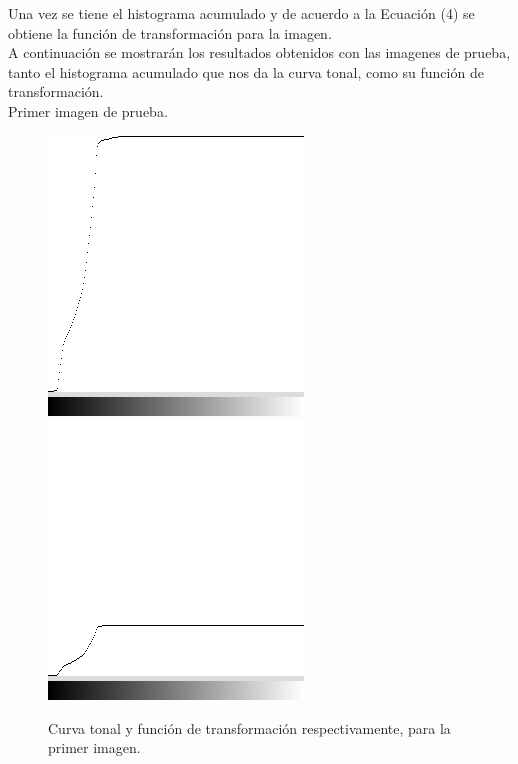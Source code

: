 \documentclass[conference]{IEEEtran}
\begin{document}
Una vez se tiene el histograma acumulado y de acuerdo a la Ecuaci\'on (4) se obtiene la funci\'on de transformaci\'on para la imagen.\\
A continuaci\'on se mostrar\'an los resultados obtenidos con las imagenes de prueba, tanto el histograma acumulado que nos da la curva tonal, como su funci\'on de transformaci\'on.\\

Primer imagen de prueba.
\begin{figure}[h]
	\begin{center}
		\setlength{\unitlength}{0.00105in}
		\includegraphics[scale=0.50]{./images/Ha1.png}
		\includegraphics[scale=0.50]{./images/Ha1_1.png}
	\end{center}
	\caption{Curva tonal y funci\'on de transformaci\'on respectivamente, para la primer imagen.}
\end{figure}
\end{document}
